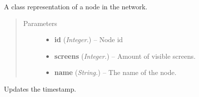 \documentclass[letterpaper,10pt,english]{sphinxmanual}
\begin{document}

\begin{fulllineitems}
\label{api:swnp.Node}
A class representation of a node in the network.
\begin{quote}\begin{description}
\item[{Parameters}] \leavevmode\begin{itemize}
\item {} 
\textbf{id} (\emph{Integer.}) -- Node id

\item {} 
\textbf{screens} (\emph{Integer.}) -- Amount of visible screens.

\item {} 
\textbf{name} (\emph{String.}) -- The name of the node.

\end{itemize}

\end{description}\end{quote}

\begin{fulllineitems}
\label{api:swnp.Node.refresh}
Updates the timestamp.

\end{fulllineitems}


\end{fulllineitems}

\end{document}
